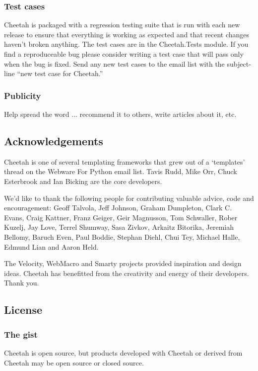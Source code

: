 \subsubsection{Test cases}
Cheetah is packaged with a regression testing suite that is run with each
new release to ensure that everything is working as expected and that recent
changes haven't broken anything.  The test cases are in the Cheetah.Tests
module.  If you find a reproduceable bug please consider writing a test case
that will pass only when the bug is fixed.  Send any new test cases to the email
list with the subject-line ``new test case for Cheetah.''

\subsubsection{Publicity}
Help spread the word ... recommend it to others, write articles about it, etc.

\subsection{Acknowledgements}
\label{intro.acknowledgments}
    
Cheetah is one of several templating frameworks that grew out of a `templates'
thread on the Webware For Python email list.  Tavis Rudd, Mike Orr, Chuck
Esterbrook and Ian Bicking are the core developers.

We'd like to thank the following people for contributing valuable advice, code
and encouragement: Geoff Talvola, Jeff Johnson, Graham Dumpleton, Clark C.
Evans, Craig Kattner, Franz Geiger, Geir Magnusson, Tom Schwaller, Rober Kuzelj,
Jay Love, Terrel Shumway, Sasa Zivkov, Arkaitz Bitorika, Jeremiah Bellomy,
Baruch Even, Paul Boddie, Stephan Diehl, Chui Tey, Michael Halle, Edmund Lian
and Aaron Held.
    
The Velocity, WebMacro and Smarty projects provided inspiration and design
ideas.  Cheetah has benefitted from the creativity and energy of their
developers. Thank you.

\subsection{License}
\label{intro.license}

\subsubsection{The gist}
Cheetah is open source, but products developed with Cheetah or derived
from Cheetah may be open source or closed source.


